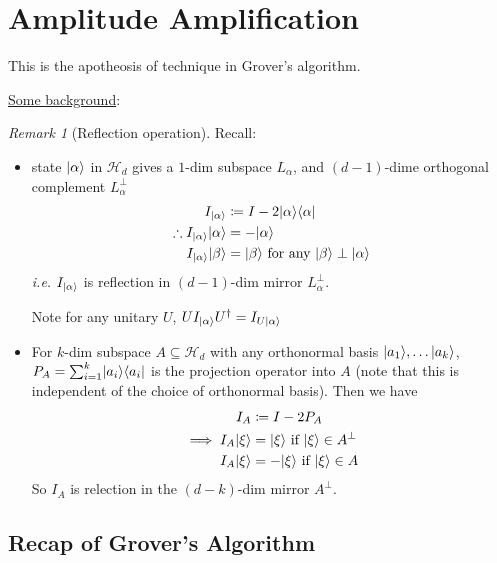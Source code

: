 \documentclass[]{article}
\DeclarePairedDelimiter\bra{\langle}{\rvert}
\DeclarePairedDelimiter\ket{\lvert}{\rangle}
\theoremstyle{custhm}
\theoremstyle{cusdef}
\theoremstyle{custhm}
\theoremstyle{custhm}
\theoremstyle{custhm}
\theoremstyle{custhm}
\theoremstyle{cusdef}
\theoremstyle{remark}
\newtheorem*{remark*}{Remark}
\begin{document}
\section{Amplitude Amplification}

	This is the apotheosis of technique in Grover's algorithm.

	\underline{Some background}:

	\begin{remark*}[Reflection operation] Recall:
		\begin{itemize}
			\item state $\ket{\alpha}$ in $\mathcal{H}_d$ gives a $1$-dim subspace $L_\alpha$, and $(d-1)$-dime orthogonal complement $L_\alpha^{\perp}$
			\begin{align*}
				I_{\ket{\alpha}} &\coloneqq I - 2\ket{\alpha}\bra{\alpha}\\
				\therefore I_{\ket{\alpha}}\ket{\alpha} &= - \ket{\alpha}\\
				I_{\ket{\alpha}}\ket{\beta} &= \ket{\beta}\ \textrm{for any }\ket{\beta}\perp\ket{\alpha}
			\end{align*}
			\textit{i.e.} $I_{\ket{\alpha}}$ is reflection in $(d-1)$-dim mirror $L_\alpha^\perp$.

			Note for any unitary $U$, $UI_{\ket{\alpha}}U^\dagger = I_{U\ket{\alpha}}$

			\item For $k$-dim subspace $A\subseteq \mathcal{H}_d$ with any orthonormal basis $\ket{a_1},\dots \ket{a_k}$, $P_A = \sum_{i=1}^{k} \ket{a_i}\bra{a_i}$ is the projection operator into $A$ (note that this is independent of the choice of orthonormal basis). Then we have
			\begin{align*}
				I_A &\coloneqq I - 2P_A\\
				\implies I_A\ket{\xi} &= \ket{\xi}\textrm{ if }\ket{\xi}\in A^{\perp}\\
				I_A\ket{\xi} &= -\ket{\xi}\textrm{ if }\ket{\xi}\in A
			\end{align*}
			So $I_A$ is relection in the $(d-k)$-dim mirror $A^\perp$.
		\end{itemize}
	\end{remark*}

\subsection*{Recap of Grover's Algorithm}
\end{document}
